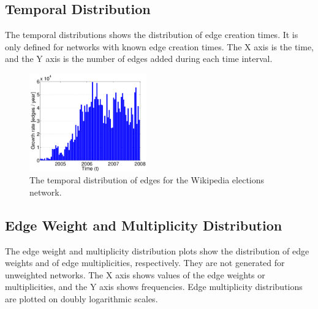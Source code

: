 \documentclass{article}
\newcommand{\wPlot}{0.45\textwidth}
\begin{document}
\subsection{Temporal Distribution}
The temporal distributions shows the distribution of edge creation
times.  It is only defined for networks with known edge creation times.
The X axis is the time, and the Y axis is the number of edges added
during each time interval.

\begin{figure}
  \centering 
  \includegraphics[width=\wPlot]{plot/time_histogram.elec}
  \caption{ 
    The temporal distribution of edges for the Wikipedia
    elections network.  
  }
\end{figure}

\subsection{Edge Weight and Multiplicity Distribution}
The edge weight and multiplicity distribution plots show the
distribution of edge weights and of edge multiplicities, respectively.
They are not generated for unweighted networks.  The X axis shows values
of the edge weights or multiplicities, and the Y axis shows frequencies.
Edge multiplicity distributions are plotted on doubly logarithmic
scales.
\end{document}
